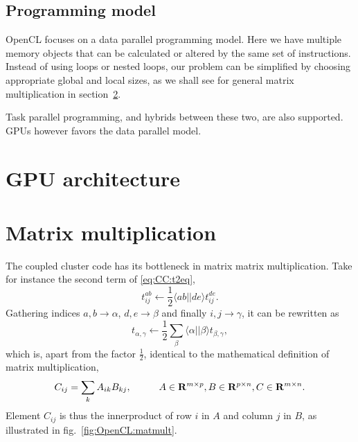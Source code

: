 \subsection{Programming model}
OpenCL focuses on a data parallel programming model.
Here we have multiple memory objects that can be calculated or altered by the same set of instructions. 
Instead of using loops or nested loops, our problem can be simplified by choosing appropriate global and local sizes, as we shall see for general matrix multiplication in section~\ref{sec:OpenCL:matmult}.

Task parallel programming, and hybrids between these two, are also supported. 
GPUs however favors the data parallel model.




\section{GPU architecture}
\label{sec:OpenCL:GPUarchitecture}




\section{Matrix multiplication}
\label{sec:OpenCL:matmult}
The coupled cluster code has its bottleneck in matrix matrix multiplication.
Take for instance the second term of \eqref{eq:CC:t2eq},
\begin{equation}
t_{ij}^{ab} \leftarrow \frac{1}{2} \langle ab||de \rangle t^{de}_{ij} .
\end{equation}
Gathering indices $a,b \rightarrow \alpha$, $d,e \rightarrow \beta$ and finally $i,j \rightarrow \gamma$, it can be rewritten as
\begin{equation}
t_{\alpha,\gamma} \leftarrow \frac{1}{2} \sum_{\beta} \langle \alpha||\beta \rangle t_{\beta,\gamma} ,
\end{equation}
which is, apart from the factor $\frac{1}{2}$, identical to the mathematical definition of matrix multiplication,
\begin{equation}
C_{ij} = \sum_k A_{ik} B_{kj},
\hspace{10mm}
A \in \mathbf{R}^{m\times p}, B \in \mathbf{R}^{p\times n}, C \in \mathbf{R}^{m\times n}.
\end{equation}
Element $C_{ij}$ is thus the innerproduct of row $i$ in $A$ and column $j$ in $B$, as illustrated in fig.~\ref{fig:OpenCL:matmult}.


